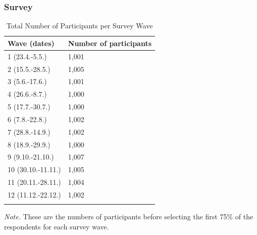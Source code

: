 \documentclass[
  english,
  jou,floatsintext]{apa7}
\begin{document}
\hypertarget{survey}{%
\subsubsection{Survey}\label{survey}}

\begin{table}[tbp]

\begin{center}
\begin{threeparttable}

\caption{\label{tab:Table-1}Total Number of Participants per Survey Wave}

\small{

\begin{tabular}{m{3.7cm}m{3.7cm}}
\toprule
Wave (dates) & \multicolumn{1}{c}{Number of participants}\\
\midrule
1 (23.4.-5.5.) & 1,001\\
2 (15.5.-28.5.) & 1,005\\
3 (5.6.-17.6.) & 1,001\\
4 (26.6.-8.7.) & 1,000\\
5 (17.7.-30.7.) & 1,000\\
6 (7.8.-22.8.) & 1,002\\
7 (28.8.-14.9.) & 1,002\\
8 (18.9.-29.9.) & 1,000\\
9 (9.10.-21.10.) & 1,007\\
10 (30.10.-11.11.) & 1,005\\
11 (20.11.-28.11.) & 1,004\\
12 (11.12.-22.12.) & 1,002\\
\bottomrule
\addlinespace
\end{tabular}

}

\begin{tablenotes}[para]
\normalsize{\textit{Note.} These are the numbers of participants before selecting the first 75\% of the respondents for each survey wave.}
\end{tablenotes}

\end{threeparttable}
\end{center}

\end{table}
\end{document}
